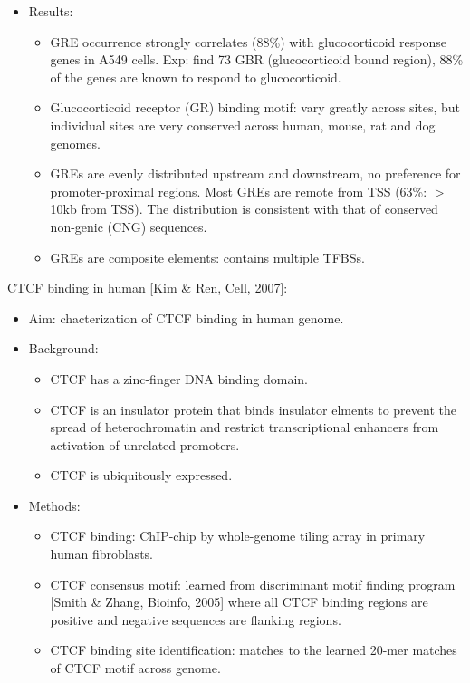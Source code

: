 \documentclass{report}
\begin{document}
\begin{enumerate}
\begin{itemize}
		\item Results:
		\begin{itemize}
			\item GRE occurrence strongly correlates (88\%) with glucocorticoid response genes in A549 cells. Exp: find 73 GBR (glucocorticoid bound region), 88\% of the genes are known to respond to glucocorticoid. 
			\item Glucocorticoid receptor (GR) binding motif: vary greatly across sites, but individual sites are very conserved across human, mouse, rat and dog genomes. 
			\item GREs are evenly distributed upstream and downstream, no preference for promoter-proximal regions. Most GREs are remote from TSS (63\%: $>$10kb from TSS). The distribution is consistent with that of conserved non-genic (CNG) sequences. 
			\item GREs are composite elements: contains multiple TFBSs. 
		\end{itemize}
	\end{itemize}
	
	CTCF binding in human [Kim \& Ren, Cell, 2007]:
	\begin{itemize}
		\item Aim: chacterization of CTCF binding in human genome. 
		
		\item Background: 
		\begin{itemize}
			\item CTCF has a zinc-finger DNA binding domain. 
			\item CTCF is an insulator protein that binds insulator elments to prevent the spread of heterochromatin and restrict transcriptional enhancers from activation of unrelated promoters. 
			\item CTCF is ubiquitously expressed. 
		\end{itemize}
		
		\item Methods: 
		\begin{itemize}
			\item CTCF binding: ChIP-chip by whole-genome tiling array in primary human fibroblasts. 
			\item CTCF consensus motif: learned from discriminant motif finding program [Smith \& Zhang, Bioinfo, 2005] where all CTCF binding regions are positive and negative sequences are flanking regions. 
			\item CTCF binding site identification: matches to the learned 20-mer matches of CTCF motif across genome. %
		\end{itemize}
		

\end{itemize}
\end{enumerate}
\end{document}
